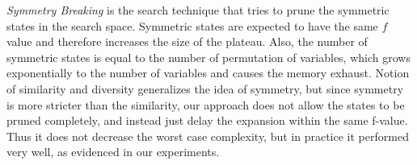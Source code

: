 \emph{Symmetry Breaking} \cite{Fox1998,pochter2011exploiting,domshlak2013symmetry} is the search technique that tries to prune the symmetric states in the search space. Symmetric states are expected to have the same $f$ value and therefore increases the size of the plateau. Also, the number of symmetric states is equal to the number of permutation of variables, which grows exponentially to the number of variables and causes the memory exhaust. Notion of similarity and diversity generalizes the idea of symmetry, but since symmetry is more stricter than the similarity, our approach does not allow the states to be pruned completely, and instead just delay the expansion within the same f-value. Thus it does not decrease the worst case complexity, but in practice it performed very well, as evidenced in our experiments.
